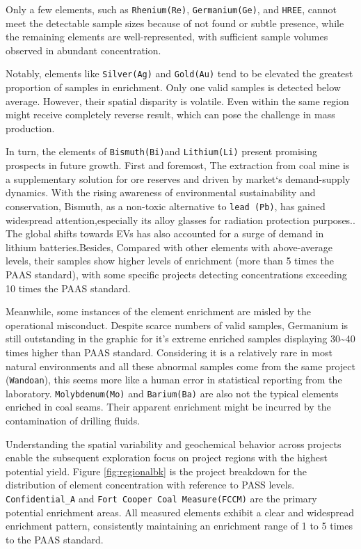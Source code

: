 \documentclass[11pt,a4paper,]{article}
\begin{document}
Only a few elements, such as \texttt{Rhenium(Re)}, \texttt{Germanium(Ge)}, and \texttt{HREE}, cannot meet the detectable sample sizes because of not found or subtle presence, while the remaining elements are well-represented, with sufficient sample volumes observed in abundant concentration.

Notably, elements like \texttt{Silver(Ag)} and \texttt{Gold(Au)} tend to be elevated the greatest proportion of samples in enrichment. Only one valid samples is detected below average. However, their spatial disparity is volatile. Even within the same region might receive completely reverse result, which can pose the challenge in mass production.

In turn, the elements of \texttt{Bismuth(Bi)}and \texttt{Lithium(Li)} present promising prospects in future growth. First and foremost, The extraction from coal mine is a supplementary solution for ore reserves and driven by market`s demand-supply dynamics. With the rising awareness of environmental sustainability and conservation, Bismuth, as a non-toxic alternative to \texttt{lead\ (Pb)}, has gained widespread attention,especially its alloy glasses for radiation protection purposes.\autocite{Buriahi2021}. The global shifts towards EVs has also accounted for a surge of demand in lithium batteries.Besides, Compared with other elements with above-average levels, their samples show higher levels of enrichment (more than 5 times the PAAS standard), with some specific projects detecting concentrations exceeding 10 times the PAAS standard.

Meanwhile, some instances of the element enrichment are misled by the operational misconduct. Despite scarce numbers of valid samples, Germanium is still outstanding in the graphic for it's extreme enriched samples displaying 30\textasciitilde40 times higher than PAAS standard. Considering it is a relatively rare in most natural environments and all these abnormal samples come from the same project (\texttt{Wandoan}), this seems more like a human error in statistical reporting from the laboratory. \texttt{Molybdenum(Mo)} and \texttt{Barium(Ba)} are also not the typical elements enriched in coal seams. Their apparent enrichment might be incurred by the contamination of drilling fluids.

Understanding the spatial variability and geochemical behavior across projects enable the subsequent exploration focus on project regions with the highest potential yield. Figure \ref{fig:regionalbk} is the project breakdown for the distribution of element concentration with reference to PASS levels. \texttt{Confidential\_A} and \texttt{Fort\ Cooper\ Coal\ Measure(FCCM)} are the primary potential enrichment areas. All measured elements exhibit a clear and widespread enrichment pattern, consistently maintaining an enrichment range of 1 to 5 times to the PAAS standard.
\end{document}
